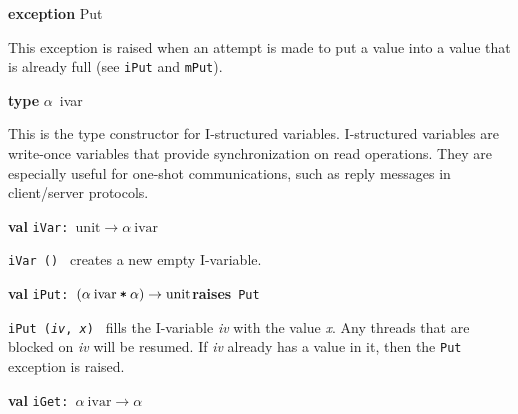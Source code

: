 \begin{descr}
\item {}{\textbf{exception}} Put\label{exn-SYNC_VAR.Put}


\begin{speccomment}
\item 

	This exception is raised when an attempt is made to put a 	value into a value that is already full (see \texttt{i\-Put} and 	\texttt{m\-Put}).\-     \end{speccomment}
\item {}{\textbf{type}} \(\alpha\)~ivar\label{ty-SYNC_VAR.ivar}

\begin{speccomment}
\item 

	This is the type constructor for I-structured variables.\- 	I-structured variables are write-once variables that provide 	synchronization on read operations.\- 	They are especially useful for one-shot communications, such 	as reply messages in client/server protocols.\-     \end{speccomment}
\item {}{\textbf{val}} {\tt iVar: \(\mathrm{unit}\rightarrow \alpha\:\mathrm{ivar}\)}\label{val-SYNC_VAR.iVar}


\begin{speccomment}
\item {\tt i\-Var ()           } 
creates a new empty I-variable.\-     \end{speccomment}
\item {}{\textbf{val}} {\tt iPut: \((\alpha\:\mathrm{ivar}\:\verb,*,\:\alpha)\rightarrow \mathrm{unit}\)}\label{val-SYNC_VAR.iPut}\hfill\textbf{raises}~\texttt{Put}


\begin{speccomment}
\item {\tt i\-Put (\textit{iv}, \textit{x})           } 
fills the I-variable \textit{iv} with the value \textit{x}.\- 	  Any threads that are blocked on \textit{iv} will be resumed.\- 	  If \textit{iv} already has a value in it, then the \texttt{Put} 	  exception is raised.\-     \end{speccomment}
\item {}{\textbf{val}} {\tt iGet: \(\alpha\:\mathrm{ivar}\rightarrow \alpha\)}\label{val-SYNC_VAR.iGet}



\end{descr}
